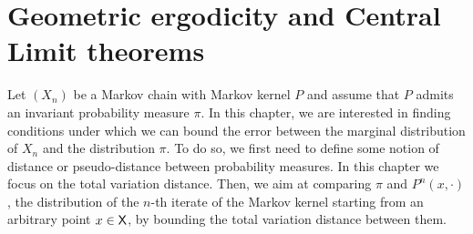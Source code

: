 \documentclass[english,graybox,envcountchap,envcountsame,sectrefs,shortlabels]{svmono}
\theoremstyle{style}
\renewenvironment{keywords}{\textit{\bf Keywords: } \sffamily }{}
\begin{document}
%
%

\chapter{Geometric ergodicity and Central Limit theorems}

\minitoc

\newcommand{\tvnorm}[1]{\left\|#1\right\|_{\mathrm{TV}}}
\newcommand{\coupling}{\mathcal{C}}

Let $(X_n)$ be a Markov chain with Markov kernel $P$ and assume that $P$ admits an invariant probability measure $\pi$. In this chapter, we are interested in finding conditions under which we can bound the error between the marginal distribution of $X_n$ and the distribution $\pi$. To do so, we first need to define some notion of distance or pseudo-distance between probability measures. In this chapter we focus on the total variation distance. Then, we aim at comparing $\pi$ and $P^n(x,\cdot)$, the distribution of the $n$-th iterate of the Markov kernel starting from an arbitrary point $x\in\mathsf{X}$, by bounding the total variation distance between them.
\end{document}
